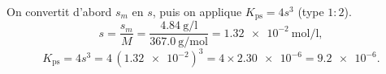 \documentclass[11pt,a4paper]{article}
\begin{document}
\begin{corrige}
On convertit d'abord $s_m$ en $s$, puis on applique $K_{\mathrm{ps}}=4s^{3}$ (type $1{:}2$).
\[ s = \dfrac{s_m}{M} = \dfrac{\qty{4.84}{\gram\per\litre}}{\qty{367.0}{\gram\per\mole}}
     = \qty{1.32e-2}{\mole\per\litre}, \]
\[ K_{\mathrm{ps}} = 4s^{3} = 4\,(\num{1.32e-2})^{3} = 4\times\num{2.30e-6} = \num{9.2e-6}. \]
\end{corrige}
\end{document}
